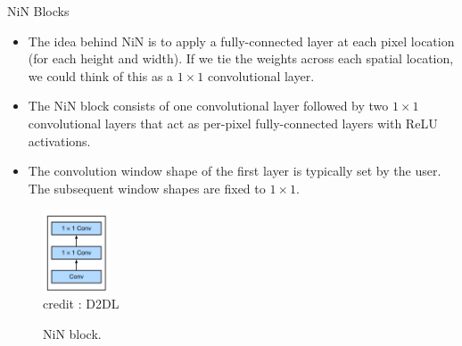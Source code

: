 \begin{vbframe}{NiN Blocks}
  \begin{itemize}
    \item The idea behind NiN is to apply a fully-connected layer at each pixel location (for each height and width). If we tie the weights across each spatial location, we could think of this as a $1 \times 1$ convolutional layer.
    \item The NiN block consists of one convolutional layer followed by two $1 \times 1$  convolutional layers that act as per-pixel fully-connected layers with ReLU activations.
    \item The convolution window shape of the first layer is typically set by the user. The subsequent window shapes are fixed to $1 \times 1$.
  \end{itemize}
  \begin{figure}
  \centering
    \includegraphics[width=2cm]{plots/moderncnn/ninblock.png}
    \tiny{\\ credit : D2DL}
    \caption{NiN block.}
  \end{figure}

\end{vbframe}



